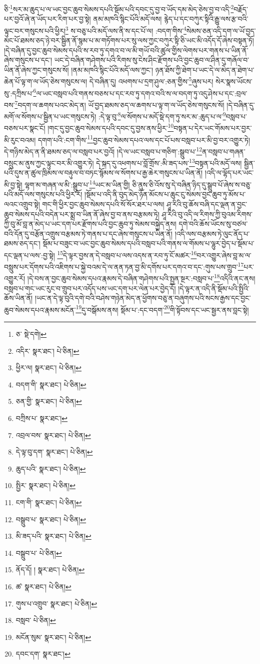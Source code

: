 ཅི་\footnote{ཅ་  སྡེ་དགེ། }སར་མ་ཆུད་པ་ལ་ཡང་བྱང་ཆུབ་སེམས་དཔའི་སྡོམ་པའི་དབང་དུ་བྱ་བ་ཡོད་དམ་མེད་ཅེས་བྱ་བ་འདི་\footnote{འདིར་  སྣར་ཐང་།  པེ་ཅིན། }བརྗོད་པར་བྱའོ་ཞེ་ན་ཡོད་པར་རིག་པར་བྱ་སྟེ། ནམ་མཁའི་སྙིང་པོའི་མདོ་ལས། རྙེད་པ་དང་བཀུར་སྟིའི་རྒྱུ་ལས་རྩ་བའི་ལྟུང་བར་གསུངས་པའི་ཕྱིར།\footnote{ཕྱིར་ལ།  སྣར་ཐང་།  པེ་ཅིན། } ས་བཅུ་པའི་མདོ་ལས་ནི་ས་དང་པོ་ལ། :བདག་གིས་\footnote{བདག་གི་  སྣར་ཐང་།  པེ་ཅིན། }སེམས་ཅན་འདི་དག་ལ་ཡོ་བྱད་མང་པོ་ཐམས་ཅད་ཉེ་བར་སྦྱིན་ནོ་སྙམ་པ་མ་གཏོགས་པར་སུ་ལས་ཀྱང་བཀུར་སྟི་ཅི་ཡང་མི་འདོད་དོ་ཞེས་བསྟན་ཏོ། །དེ་བཞིན་དུ་བྱང་ཆུབ་སེམས་དཔའི་ས་རབ་ཏུ་དགའ་བ་ལ་མི་གཡོ་བའི་ཚུལ་གྱིས་ལེགས་པར་གནས་པ་ཡིན་ནོ་ཞེས་གསུངས་པ་དང་། ཡང་དེ་བཞིན་གཤེགས་པའི་རིགས་སུ་ངེས་ཤིང་རྫོགས་པའི་བྱང་ཆུབ་ལ་ཤིན་དུ་གཞོལ་བ་ཡིན་ནོ་ཞེས་ཀྱང་གསུངས་སོ། །ནམ་མཁའི་སྙིང་པོའི་མདོ་ལས་ཀྱང་། ཉན་ཐོས་ཀྱི་ཐེག་པ་ཡང་དེ་ལ་མེད་ན་ཐེག་པ་ཆེན་པོ་ལྟ་ག་ལ་ཡོད་ཅེས་གསུངས་ལ། དེ་བཞིན་དུ། འཕགས་པ་དྲག་ཤུལ་:ཅན་གྱིས་\footnote{ཅན་གྱི་  སྣར་ཐང་།  པེ་ཅིན། }ཞུས་པར། སེར་སྣས་ཡོངས་སུ་:དཀྲིས་པ་\footnote{བཀྲིས་པ་  སྣར་ཐང་། }ལ་ཡང་བསླབ་པའི་གནས་བཅས་པ་དང་རབ་ཏུ་དགའ་བའི་ས་ལ་བདག་ཏུ་འདུ་ཤེས་པ་དང་:བྲལ་བས་\footnote{འབྲལ་བས་  སྣར་ཐང་།  པེ་ཅིན། }བདག་ལ་ཆགས་པའང་མེད་ན། ཡོ་བྱད་ཐམས་ཅད་ལ་ཆགས་པ་ལྟ་ག་ལ་ཡོད་ཅེས་གསུངས་སོ། །དེ་བཞིན་དུ་མགོ་ལ་སོགས་པ་སྦྱིན་པ་ཡང་གསུངས་ཏེ། :དེ་ལྟ་བུ་\footnote{དེ་ལྟ་བུ་དག་  སྣར་ཐང་།  པེ་ཅིན། }ལ་སོགས་པ་མདོ་སྡེ་དག་ཏུ་སར་མ་:ཆུད་པ་ལ་\footnote{ཆུད་པའི་  སྣར་ཐང་།  པེ་ཅིན། }བསླབ་པ་བཅས་པར་སྣང་ངོ། །གང་དུ་བྱང་ཆུབ་སེམས་དཔའི་དབང་དུ་བྱས་ནས་ཕྱིར་\footnote{སྤྱིར་  སྣར་ཐང་།  པེ་ཅིན། }བསྟན་པ་དེར་ཡང་གོམས་པར་བྱར་མི་རུང་བའམ། དགག་པའི་:ངག་གིས་\footnote{ངག་གི་  སྣར་ཐང་།  པེ་ཅིན། }བྱང་ཆུབ་སེམས་དཔའ་ལས་དང་པོ་པས་བསླབ་པར་མི་བྱ་བར་འགྱུར་ཏེ། དེ་གཉིས་མེད་ན་ནི་ཐམས་ཅད་ལ་བསླབ་པར་བྱའོ། །དེ་ལ་ཡང་བསླབ་པ་གཅིག་:སྒྲུབ་པ་\footnote{བསྒྲུབ་པ་  སྣར་ཐང་།  པེ་ཅིན། }ན་བསླབ་པ་གཞན་བསྲུང་མ་ནུས་ཀྱང་ལྟུང་བར་མི་འགྱུར་ཏེ། དེ་སྐད་དུ་འཕགས་པ་བློ་གྲོས་:མི་ཟད་པས་\footnote{མི་ཟད་པའི་  སྣར་ཐང་།  པེ་ཅིན། }བསྟན་པའི་མདོ་ལས། སྦྱིན་པའི་དུས་ན་ཚུལ་ཁྲིམས་ལ་བརྟུལ་བ་བཏང་སྙོམས་ལ་སོགས་པ་རྒྱ་ཆེར་གསུངས་པ་ཡིན་ནོ། །འདི་ལ་ལྷོད་པར་ཡང་མི་བྱ་སྟེ། ལྷག་མ་གཞན་ལ་མི་:སྒྲུབ་པ་\footnote{བསྒྲུབ་པ་  པེ་ཅིན། }ཡང་མ་ཡིན་གྱི། ཅི་ནུས་ཅི་འོས་སུ་དེ་བཞིན་ཉིད་དུ་སྒྲུབ་པོ་ཞེས་ས་བཅུ་པའི་མདོ་ལས་གསུངས་པའི་ཕྱིར་རོ། །སྡོམ་པ་འདི་ནི་བུད་མེད་ཉོན་མོངས་པ་ཆུང་ངུ་སེམས་བྱང་ཆུབ་ཏུ་མོས་པ་ལའང་འགྲུབ་སྟེ། གང་གི་ཕྱིར་བྱང་ཆུབ་སེམས་དཔའི་སོ་སོར་ཐར་པ་ལས། ཤཱ་རིའི་བུ་ཆོས་བཞི་དང་ལྡན་ན་བྱང་ཆུབ་སེམས་དཔའི་བདེན་པར་སྨྲ་བ་ཡིན་ནོ་ཞེས་བྱ་བ་ནས་བརྩམས་ཏེ། ཤཱ་རིའི་བུ་འདི་ལ་རིགས་ཀྱི་བུའམ་རིགས་ཀྱི་བུ་མོ་བླ་ན་མེད་པ་ཡང་དག་པར་རྫོགས་པའི་བྱང་ཆུབ་ཏུ་སེམས་བསྐྱེད་ནས། དགེ་བའི་ཆོས་ཡོངས་སུ་བཙལ་བའི་དོན་དུ་བརྩོན་འགྲུས་བརྩམས་ཏེ་གནས་པ་དང་ཞེས་གསུངས་པ་ཡིན་ནོ། །འདི་ལས་བརྩམས་ཏེ་ལུང་ནོད་པ་ཐམས་ཅད་དང་། སྡོམ་པ་བཟུང་བ་ཡང་བྱང་ཆུབ་སེམས་དཔའི་བསླབ་པའི་གནས་ལ་གོམས་པ་ལྷུར་བྱེད་པ་སྡོམ་པ་དང་ལྡན་པ་ལས་:བྱ་སྟེ། \footnote{ནོད་དོ། །   སྣར་ཐང་།  པེ་ཅིན། }དེ་ལྟར་བྱས་ན་དེ་བསླབ་པ་ལས་འདས་ན་རབ་ཏུ་ངོ་མཚར་\footnote{ཚ་  སྣར་ཐང་།  པེ་ཅིན། }བར་འགྱུར་ཞེས་བླ་མ་ལ་བསླུས་པར་དོགས་པའི་འཇིགས་པ་སྐྱེ་བའམ་དེ་ལ་ནན་ཏན་བྱ་མི་དགོས་པར་དགའ་བ་དང་:གུས་པས་གྲུབ་\footnote{གུས་པ་འགྲུབ་  སྣར་ཐང་།  པེ་ཅིན། }པར་འགྱུར་རོ། །དེ་བས་ན་བྱང་ཆུབ་སེམས་དཔའ་རྣམས་དེ་བཞིན་གཤེགས་པའི་སྤྱན་སྔར་:བསླབ་པ་\footnote{བསླབ་  པེ་ཅིན། }འདིའི་ནང་ནས། བསླབ་པ་གང་ཡང་རུང་བ་གྲུབ་པར་འདོད་པས་ཡང་དག་པར་ལེན་པར་བྱེད་དོ། །དེ་ལྟར་ན་འདི་ནི་སྡོམ་པའི་སྤྱིའི་ཆོས་ཡིན་ནོ། །ཡང་ན་དེ་ལྟ་བུའི་དགེ་བའི་བཤེས་གཉེན་མེད་ན་ཕྱོགས་བཅུ་ན་བཞུགས་པའི་སངས་རྒྱས་དང་བྱང་ཆུབ་སེམས་དཔའ་རྣམས་མངོན་\footnote{མངོན་སུམ་  སྣར་ཐང་།  པེ་ཅིན། }དུ་བསྒོམས་ནས། སྡོམ་པ་:དང་བདག་\footnote{དབང་དག་  སྣར་ཐང་། }གི་སྟོབས་དང་ཡང་སྦྱར་ནས་བླང་སྟེ། 